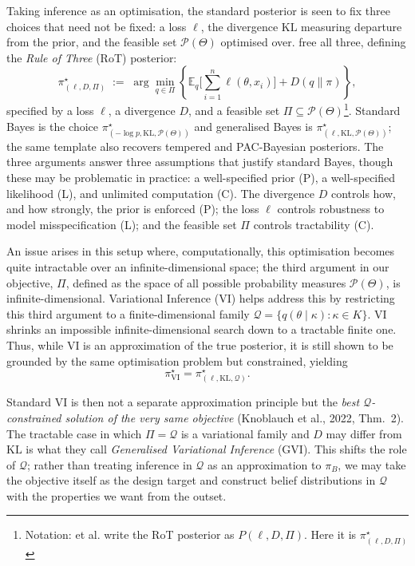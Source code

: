 \documentclass[mstat,12pt]{unswthesis}
\newcommand{\add}[1]{{\color{red}#1}}
\begin{document}
Taking inference as an optimisation, the standard posterior is seen to fix three choices that need not be fixed: a loss $\ell$, the divergence $\mathrm{KL}$ measuring departure from the prior, and the feasible set $\mathcal{P}(\Theta)$ optimised over. \citet{knoblauch2022optimization} free all three, defining the \emph{Rule of Three} (RoT) posterior:
\begin{equation}
    \pi^{\star}_{(\ell, D, \Pi)} \;:=\; \arg\min_{q \in \Pi} \left\{ \mathbb{E}_{q}\Big[\sum_{i=1}^{n} \ell(\theta, x_i)\Big] + D(q \| \pi) \right\},
\end{equation}
specified by a loss $\ell$, a divergence $D$, and a feasible set $\Pi \subseteq \mathcal{P}(\Theta)$\footnote{Notation: \citet{knoblauch2022optimization} et al. write the RoT posterior as $P(\ell, D, \Pi)$. Here it is $\pi^\star_{(\ell,D,\Pi)}$ }. Standard Bayes is the choice $\pi^{\star}_{(-\log p, \mathrm{KL}, \mathcal{P}(\Theta))}$ and generalised Bayes is $\pi^{\star}_{(\ell, \mathrm{KL}, \mathcal{P}(\Theta))}$; the same template also recovers tempered and PAC-Bayesian posteriors.
The three arguments answer three assumptions that justify standard Bayes, though these may be problematic in practice: a well-specified prior (P), a well-specified likelihood (L), and unlimited computation (C). The divergence $D$ controls how, and how strongly, the prior is enforced (P); the loss $\ell$ controls robustness to model misspecification (L); and the feasible set $\Pi$ controls tractability (C).

An issue arises in this setup where, computationally, this optimisation becomes quite intractable over an infinite-dimensional space; the third argument in our objective, $\Pi$, defined as the space of all possible probability measures $\mathcal{P}(\Theta)$, is infinite-dimensional. Variational Inference (VI) helps address this by restricting this third argument to a finite-dimensional family $\mathcal{Q} = \{q(\theta \mid \kappa) : \kappa \in K\}$. VI shrinks an impossible infinite-dimensional search down to a tractable finite one. Thus, while VI is an approximation of the true posterior, it is still shown to be grounded by the same optimisation problem but constrained, yielding
$$
    \pi^{\star}_{\mathrm{VI}} = \pi^{\star}_{(\ell, \mathrm{KL}, \mathcal{Q})}.
$$


Standard VI is then not a separate approximation principle but the \emph{best $\mathcal{Q}$-constrained solution of the very same objective} (Knoblauch et al., 2022, Thm.~2). The tractable case in which $\Pi = \mathcal{Q}$ is a variational family and $D$ may differ from $\mathrm{KL}$ is what they call \emph{Generalised Variational Inference} (GVI). This shifts the role of $\mathcal{Q}$; rather than treating inference in $\mathcal{Q}$ as an approximation to $\pi_B$, we may take the objective itself as the design target and construct belief distributions in $\mathcal{Q}$ with the properties we want from the outset.
\end{document}
